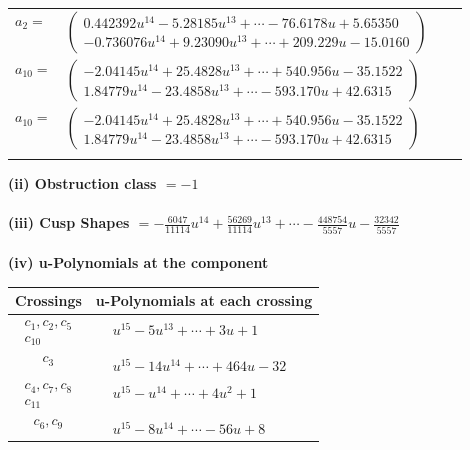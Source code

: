 \documentclass[1p]{elsarticle_modified}
\theoremstyle{definition}
\begin{document}
\begin{tabular}{m{7pt} m{180pt} m{7pt} m{180pt} }
\flushright $a_{2}=$&$\begin{pmatrix}0.442392 u^{14}-5.28185 u^{13}+\cdots-76.6178 u+5.65350\\-0.736076 u^{14}+9.23090 u^{13}+\cdots+209.229 u-15.0160\end{pmatrix}$ \\
\flushright $a_{10}=$&$\begin{pmatrix}-2.04145 u^{14}+25.4828 u^{13}+\cdots+540.956 u-35.1522\\1.84779 u^{14}-23.4858 u^{13}+\cdots-593.170 u+42.6315\end{pmatrix}$\\ \flushright $a_{10}=$&$\begin{pmatrix}-2.04145 u^{14}+25.4828 u^{13}+\cdots+540.956 u-35.1522\\1.84779 u^{14}-23.4858 u^{13}+\cdots-593.170 u+42.6315\end{pmatrix}$\\&\end{tabular}
\flushleft \textbf{(ii) Obstruction class $= -1$}\\~\\
\flushleft \textbf{(iii) Cusp Shapes $= -\frac{6047}{11114} u^{14}+\frac{56269}{11114} u^{13}+\cdots-\frac{448754}{5557} u-\frac{32342}{5557}$}\\~\\
\newpage\renewcommand{\arraystretch}{1}
\flushleft \textbf{(iv) u-Polynomials at the component}\newline \\
\begin{tabular}{m{50pt}|m{274pt}}
Crossings & \hspace{64pt}u-Polynomials at each crossing \\
\hline $$\begin{aligned}c_{1},c_{2},c_{5}\\c_{10}\end{aligned}$$&$\begin{aligned}
&u^{15}-5 u^{13}+\cdots+3 u+1
\end{aligned}$\\
\hline $$\begin{aligned}c_{3}\end{aligned}$$&$\begin{aligned}
&u^{15}-14 u^{14}+\cdots+464 u-32
\end{aligned}$\\
\hline $$\begin{aligned}c_{4},c_{7},c_{8}\\c_{11}\end{aligned}$$&$\begin{aligned}
&u^{15}- u^{14}+\cdots+4 u^2+1
\end{aligned}$\\
\hline $$\begin{aligned}c_{6},c_{9}\end{aligned}$$&$\begin{aligned}
&u^{15}-8 u^{14}+\cdots-56 u+8
\end{aligned}$\\
\hline
\end{tabular}\\~\\
\end{document}
